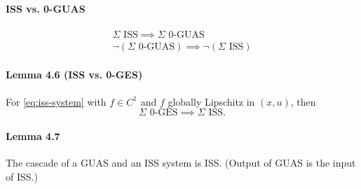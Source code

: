 \paragraph{ISS vs. 0-GUAS}
\begin{gather}
	\Sigma \mbox{ ISS} \implies \Sigma \mbox{ 0-GUAS} \\
	\neg (\Sigma \mbox{ 0-GUAS}) \implies \neg (\Sigma \mbox{ ISS})
\end{gather}

\paragraph{Lemma 4.6 (ISS vs. 0-GES)}
For \eqref{eq:iss-system} with $f \in C^1$ and $f$ globally Lipschitz in $(x,u)$, then
\begin{equation}
	\Sigma \mbox{ 0-GES} \implies \Sigma \mbox{ ISS}
	.
\end{equation}

\paragraph{Lemma 4.7}
The cascade of a GUAS and an ISS system is ISS. (Output of GUAS is the input of ISS.)
